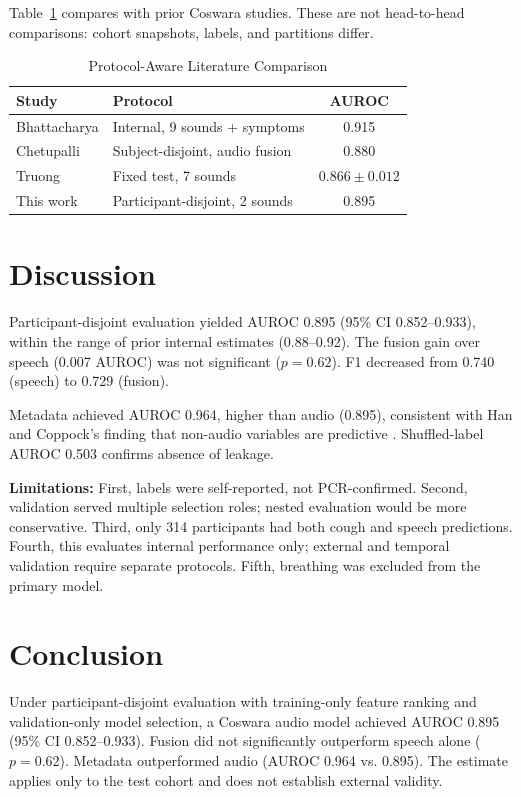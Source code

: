 \documentclass[conference]{IEEEtran}
\begin{document}
Table~\ref{tab:context} compares with prior Coswara studies. These are not head-to-head comparisons: cohort snapshots, labels, and partitions differ.

\begin{table}[!t]
\caption{Protocol-Aware Literature Comparison}
\label{tab:context}
\centering
\footnotesize
\begin{tabular}{llc}
\toprule
Study & Protocol & AUROC \\
\midrule
Bhattacharya \cite{bhattacharya2023coswara} & Internal, 9 sounds + symptoms & 0.915 \\
Chetupalli \cite{chetupalli2023multimodal} & Subject-disjoint, audio fusion & 0.880 \\
Truong \cite{truong2024fair} & Fixed test, 7 sounds & $0.866\pm0.012$ \\
\midrule
This work & Participant-disjoint, 2 sounds & 0.895 \\
\bottomrule
\end{tabular}
\end{table}

\section{Discussion}

Participant-disjoint evaluation yielded AUROC 0.895 (95\% CI 0.852--0.933), within the range of prior internal estimates (0.88--0.92). The fusion gain over speech (0.007 AUROC) was not significant ($p=0.62$). F1 decreased from 0.740 (speech) to 0.729 (fusion).

Metadata achieved AUROC 0.964, higher than audio (0.895), consistent with Han and Coppock's finding that non-audio variables are predictive \cite{han2022realistic,coppock2024audio}. Shuffled-label AUROC 0.503 confirms absence of leakage.

\textbf{Limitations:} First, labels were self-reported, not PCR-confirmed. Second, validation served multiple selection roles; nested evaluation would be more conservative. Third, only 314 participants had both cough and speech predictions. Fourth, this evaluates internal performance only; external and temporal validation require separate protocols. Fifth, breathing was excluded from the primary model.

\section{Conclusion}

Under participant-disjoint evaluation with training-only feature ranking and validation-only model selection, a Coswara audio model achieved AUROC 0.895 (95\% CI 0.852--0.933). Fusion did not significantly outperform speech alone ($p=0.62$). Metadata outperformed audio (AUROC 0.964 vs. 0.895). The estimate applies only to the test cohort and does not establish external validity.



\end{document}
